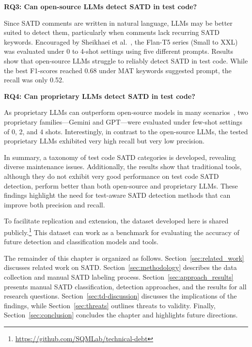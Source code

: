 \textbf{RQ3: Can open-source LLMs detect SATD in test code?}

Since SATD comments are written in natural language, LLMs may be better suited to detect them, particularly when comments lack recurring SATD keywords. Encouraged by Sheikhaei et al.~\cite{sheikhaei_empirical_2024}, the Flan-T5 series (Small to XXL) was evaluated under 0 to 4-shot settings using five different prompts. Results show that open-source LLMs struggle to reliably detect SATD in test code. While the best F1-scores reached 0.68 under MAT keywords suggested prompt, the recall was only 0.52.

\textbf{RQ4: Can proprietary LLMs detect SATD in test code?}

As proprietary LLMs can outperform open-source models in many scenarios~\cite{mayer_can_2024}, two proprietary families—Gemini and GPT—were evaluated under few-shot settings of 0, 2, and 4 shots. Interestingly, in contrast to the open-source LLMs, the tested proprietary LLMs exhibited very high recall but very low precision.

In summary, a taxonomy of test code SATD categories is developed, revealing diverse maintenance issues. Additionally, the results show that traditional tools, although they do not exhibit very good performance on test code SATD detection, perform better than both open-source and proprietary LLMs. These findings highlight the need for test-aware SATD detection methods that can improve both precision and recall.

To facilitate replication and extension, the dataset developed here is shared publicly.\footnote{\url{https://github.com/SQMLab/technical-debt}} This dataset can work as a benchmark for evaluating the accuracy of future detection and classification models and tools.

The remainder of this chapter is organized as follows. Section~\ref{sec:related_work} discusses related work on SATD. Section~\ref{sec:methodology} describes the data collection and manual SATD labeling process. Section~\ref{sec:approach_results} presents manual SATD classification, detection approaches, and the results for all research questions. Section~\ref{sec:td-discussion} discusses the implications of the findings, while Section~\ref{sec:threats} outlines threats to validity. Finally, Section~\ref{sec:conclusion} concludes the chapter and highlights future directions.










